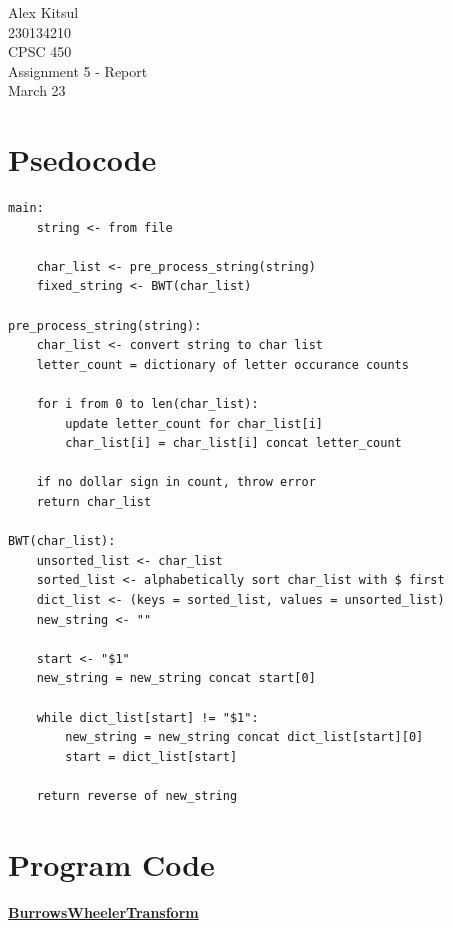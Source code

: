 \documentclass{article}
\begin{document}
\thispagestyle{empty}
\begin{center}
\vspace*{\fill}
\Huge Alex Kitsul\\
\Huge 230134210\\
\Huge CPSC 450\\
\Huge Assignment 5 - Report\\
\Huge March 23\\
\vspace*{\fill}
\end{center}
\pagebreak

\section*{Psedocode}
\begin{lstlisting}
main:
    string <- from file

    char_list <- pre_process_string(string)
    fixed_string <- BWT(char_list)
	
pre_process_string(string):
    char_list <- convert string to char list
    letter_count = dictionary of letter occurance counts

    for i from 0 to len(char_list):
        update letter_count for char_list[i]
        char_list[i] = char_list[i] concat letter_count

    if no dollar sign in count, throw error
    return char_list
			
BWT(char_list):
    unsorted_list <- char_list
    sorted_list <- alphabetically sort char_list with $ first
    dict_list <- (keys = sorted_list, values = unsorted_list)
    new_string <- ""

    start <- "$1"
    new_string = new_string concat start[0]

    while dict_list[start] != "$1":
        new_string = new_string concat dict_list[start][0]
        start = dict_list[start]

    return reverse of new_string

\end{lstlisting}

\pagebreak

\section*{Program Code}
\textbf{\underline{BurrowsWheelerTransform}}


\pagebreak
\end{document}
